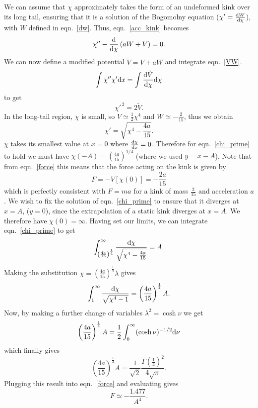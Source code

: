 \documentclass[11pt, oneside,titlepage]{article}  	%
\numberwithin{equation}{section}
\newcommand{\drv}{\ensuremath{\textup{d}}}
\begin{document}
We can assume that $\chi$ approximately takes the form of an undeformed kink over its long tail, ensuring that it is a solution of the Bogomolny equation ($\chi' = \frac{\drv W }{\drv \chi}$), with $W$ defined in eqn.~\ref{dw}. Thus, eqn.~\ref{acc_kink} becomes
\begin{equation}\label{VW}
\chi'' -\frac{\drv}{\drv \chi}\left ( aW + V \right ) =0.
\end{equation}
We can now define a modified potential $\tilde{V} = V +aW$ and integrate eqn.~\ref{VW}.
\begin{equation}
\int \chi'' \chi' \drv x = \int \frac{\drv \tilde{V}}{\drv \chi} \drv \chi
\end{equation}
to get
\begin{equation}
\chi'^{\,2} = 2 \tilde{V}.
\end{equation}
In the long-tail region, $\chi$ is small, so $V\simeq \frac{1}{2}\chi^4$ and $W\simeq -\frac{2}{15}$, thus we obtain
\begin{equation}\label{chi_prime}
\chi' = \sqrt{\chi^4 - \frac{4a}{15}}.
\end{equation}
$\chi$ takes its smallest value at $x=0$ where $\frac{\drv\chi}{\drv x}=0$. Therefore for eqn.~\ref{chi_prime} to hold we must have $\chi(-A) = \left( \frac{4a}{15} \right)^{1/4}$ (where we used $y = x-A$). Note that from eqn.~\ref{force} this means that the force acting on the kink is given by
\begin{equation}
F = -V\left[\chi(0)\right] = -\frac{2a}{15}
\end{equation}
which is perfectly consistent with $F = ma$ for a kink of mass $\frac{2}{15}$ and acceleration $a$. We wish to fix the solution of eqn.~\ref{chi_prime} to ensure that it diverges at $x = A$, ($y = 0$), since the extrapolation of a static kink diverges at $x=A$. We therefore have $\chi(0) = \infty$. Having set our limits, we can integrate eqn.~\ref{chi_prime} to get
\begin{equation}
\int_{ \left( \frac{4a}{15} \right)^{\frac{1}{4}}}^{\infty}\frac{\drv \chi}{\sqrt{\chi^4 - \frac{4a}{15}}} = A.
\end{equation}
Making the substitution $\chi =\left( \frac{4a}{15}\right)^{\frac{1}{4}}\lambda$ gives
\begin{equation}
 \int_{1}^{\infty}\frac{\drv \chi}{\sqrt{\chi^4 - 1}} = \left( \frac{4a}{15}\right)^{\frac{1}{4}} A.
\end{equation}
Now, by making a further change of variables $\lambda^2 = \cosh\nu$ we get
\begin{equation}
 \left( \frac{4a}{15}\right)^{\frac{1}{4}} A = \frac{1}{2}\int_{0}^{\infty} (\cosh\nu)^{-1/2}\drv \nu
\end{equation}
which finally gives
\begin{equation}
 \left( \frac{4a}{15}\right)^{\frac{1}{4}} A =\frac{1}{\sqrt{2}}\frac{\Gamma \left( \frac{1}{4}\right)^2}{4\sqrt{\pi}}.
\end{equation}
Plugging this result into eqn.~\ref{force} and evaluating gives
\begin{equation} \label{prediction}
F \simeq -\frac{1.477}{A^4}.
\end{equation}
\end{document}
